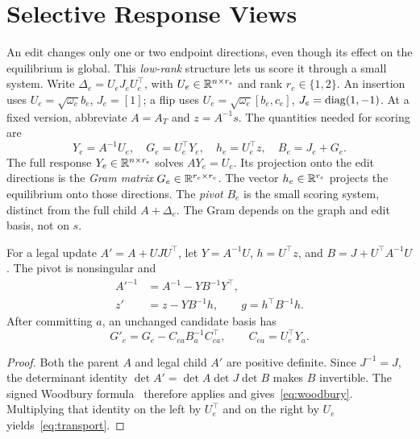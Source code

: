 \section{Selective Response Views}
\label{sec:responses}

An edit changes only one or two endpoint directions, even though its effect on the equilibrium is global. This \emph{low-rank} structure lets us score it through a small system. Write $\Delta_e=U_eJ_eU_e^\top$, with $U_e\in\mathbb R^{n\times r_e}$ and rank $r_e\in\{1,2\}$. An insertion uses $U_e=\sqrt{\omega_e}b_e$, $J_e=[1]$; a flip uses $U_e=\sqrt{\omega_e}[b_e,c_e]$, $J_e=\operatorname{diag}(1,-1)$. At a fixed version, abbreviate $A=A_T$ and $z=A^{-1}s$. The quantities needed for scoring are
\begin{equation}
 Y_e=A^{-1}U_e,\quad G_e=U_e^\top Y_e,\quad
 h_e=U_e^\top z,\quad B_e=J_e+G_e.
 \label{eq:gram}
\end{equation}
The full response $Y_e\in\mathbb R^{n\times r_e}$ solves $AY_e=U_e$. Its projection onto the edit directions is the \emph{Gram matrix} $G_e\in\mathbb R^{r_e\times r_e}$. The vector $h_e\in\mathbb R^{r_e}$ projects the equilibrium onto those directions. The \emph{pivot} $B_e$ is the small scoring system, distinct from the full child $A+\Delta_e$. The Gram depends on the graph and edit basis, not on $s$.

\begin{lemma}\label{lem:woodbury}
For a legal update $A'=A+UJU^\top$, let $Y=A^{-1}U$, $h=U^\top z$, and $B=J+U^\top A^{-1}U$. The pivot is nonsingular and
\begin{equation}
 \begin{aligned}
 A'^{-1}&=A^{-1}-YB^{-1}Y^\top,\\
 z'&=z-YB^{-1}h,\qquad g=h^\top B^{-1}h.
 \end{aligned}
 \label{eq:woodbury}
\end{equation}
After committing $a$, an unchanged candidate basis has
\begin{equation}
 G'_e=G_e-C_{ea}B_a^{-1}C_{ea}^\top,
 \qquad C_{ea}=U_e^\top Y_a.
 \label{eq:transport}
\end{equation}
\end{lemma}
\begin{proof}
Both the parent $A$ and legal child $A'$ are positive definite. Since $J^{-1}=J$, the determinant identity $\det A'=\det A\det J\det B$ makes $B$ invertible. The signed Woodbury formula~\cite{Hager1989} therefore applies and gives~\eqref{eq:woodbury}. Multiplying that identity on the left by $U_e^\top$ and on the right by $U_e$ yields~\eqref{eq:transport}.
\end{proof}

